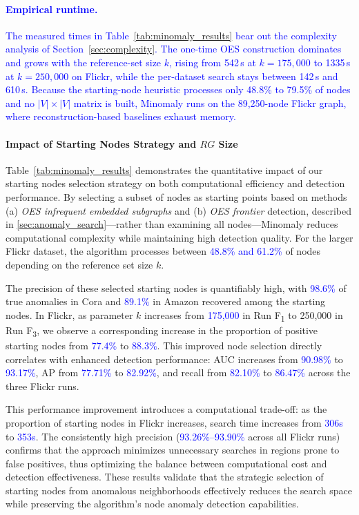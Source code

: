 \documentclass[preprint,12pt]{elsarticle}
\newcommand{\new}[1]{\textcolor{blue}{#1}}
\theoremstyle{plain}
\theoremstyle{definition}
\theoremstyle{remark}
\begin{document}
\paragraph{\new{Empirical runtime.}}
\new{The measured times in Table~\ref{tab:minomaly_results} bear out the complexity analysis of Section~\ref{sec:complexity}. The one-time OES construction dominates and grows with the reference-set size $k$, rising from 542\,s at $k=175{,}000$ to 1335\,s at $k=250{,}000$ on Flickr, while the per-dataset search stays between 142\,s and 610\,s. Because the starting-node heuristic processes only 48.8\% to 79.5\% of nodes and no $|V|\times|V|$ matrix is built, Minomaly runs on the 89{,}250-node Flickr graph, where reconstruction-based baselines exhaust memory.}

\paragraph{Impact of Starting Nodes Strategy and $RG$ Size}

Table~\ref{tab:minomaly_results} demonstrates the quantitative impact of our starting nodes selection strategy on both computational efficiency and detection performance. By selecting a subset of nodes as starting points based on methods (a) \textit{OES infrequent embedded subgraphs} and (b) \textit{OES frontier} detection, described in \ref{sec:anomaly_search}—rather than examining all nodes—Minomaly reduces computational complexity while maintaining high detection quality. For the larger Flickr dataset, the algorithm processes between \new{48.8\% and 61.2\%} of nodes depending on the reference set size $k$.

The precision of these selected starting nodes is quantifiably high, with \new{98.6\%} of true anomalies in Cora and \new{89.1\%} in Amazon recovered among the starting nodes. In Flickr, as parameter $k$ increases from \new{175,000} in Run F\textsubscript{1} to 250,000 in Run F\textsubscript{3}, we observe a corresponding increase in the proportion of positive starting nodes from \new{77.4\%} to \new{88.3\%}. This improved node selection directly correlates with enhanced detection performance: AUC increases from \new{90.98\%} to \new{93.17\%}, AP from \new{77.71\%} to \new{82.92\%}, and recall from \new{82.10\%} to \new{86.47\%} across the three Flickr runs.

This performance improvement introduces a computational trade-off: as the proportion of starting nodes in Flickr increases, search time increases from \new{306s} to \new{353s}. The consistently high precision (\new{93.26\%--93.90\%} across all Flickr runs) confirms that the approach minimizes unnecessary searches in regions prone to false positives, thus optimizing the balance between computational cost and detection effectiveness. These results validate that the strategic selection of starting nodes from anomalous neighborhoods effectively reduces the search space while preserving the algorithm's node anomaly detection capabilities.
\end{document}
